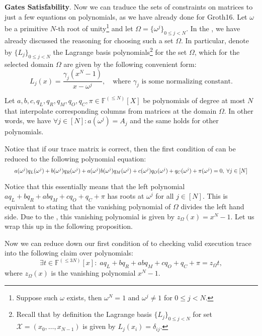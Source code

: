 \documentclass[../lecture-notes.tex]{subfiles}
\begin{document}
\textcolor{blue!80!black}{\textbf{Gates Satisfability}.} Now we can traduce the
sets of constraints on matrices to just a few equations on polynomials, as we
have already done for Groth16. Let $\omega$ be a primitive $N$-th root of
unity\footnote{Suppose such $\omega$ exists, then $\omega^N = 1$ and $\omega^j
\neq 1$ for $0 \le j < N$.} and let $\Omega = \{\omega^j\}_{0 \leq j < N}$. In
the , we have already discussed the reasoning for choosing
such a set $\Omega$. In particular, denote by $\{L_j\}_{0 \leq j < N}$ the
Lagrange basis polynomials\footnote{Recall that by definition the Lagrange basis
$\{L_j\}_{0 \leq j < N}$ for set $\mathcal{X}=(x_0,\dots,x_{N-1})$ is given by
$L_j(x_i) = \delta_{ij}$.} for the set $\Omega$, which for the selected domain
$\Omega$ are given by the following convenient form:
\begin{equation*}
    L_j(x) = \frac{\gamma_j(x^N - 1)}{x-\omega^j}, \quad \text{where $\gamma_j$ is some normalizing constant.}
\end{equation*}

Let $a, b, c, q_L, q_R, q_M, q_O, q_C, \pi \in \mathbb{F}^{(\leq N)}[X]$ be
polynomials of degree at most $N$ that interpolate corresponding columns from
matrices at the domain $\Omega$. In other words, we have \(\forall j \in [N]:
a(\omega^j) = A_j\) and the same holds for other polynomials.

Notice that if our trace matrix is correct, then the first condition of
 can be reduced to the following polynomial
equation:
\begin{equation*}
    \scalebox{0.8}{$
        a(\omega^j)q_L(\omega^j) + b(\omega^j)q_R(\omega^j) + a(\omega^j)b(\omega^j)q_M(\omega^j) + c(\omega^j)q_O(\omega^j) + q_C(\omega^j) + \pi(\omega^j) = 0, \; \forall j \in [N]
    $}
\end{equation*}

Notice that this essentially means that the left polynomial $aq_L + bq_R + abq_M
+ cq_O + q_C + \pi$ has roots at $\omega^j$ for all $j \in [N]$. This is
equivalent to stating that the vanishing polynomial of $\Omega$ divides the left
hand side. Due to the , this vanishing
polynomial is given by $z_{\Omega}(x) = x^N-1$.  Let us wrap this up in the
following proposition.

\begin{proposition}
    Now we can reduce down our first condition of 
    to checking valid execution trace into the following claim over polynomials:
    \[\exists t \in \mathbb{F}^{(\leq 3N)}[x]: \; aq_L + bq_R + abq_M + cq_O + q_C + \pi = z_{\Omega}t,\]
    where $z_{\Omega}(x)$ is the vanishing polynomial $x^N - 1$.
\end{proposition}
\end{document}
